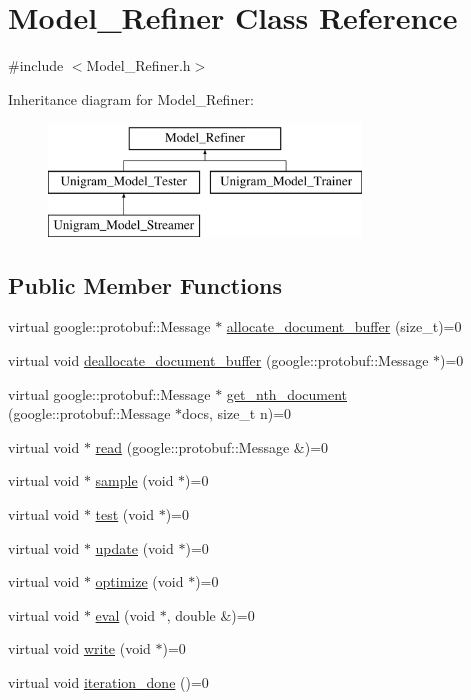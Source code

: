 \hypertarget{class_model___refiner}{
\section{Model\_\-Refiner Class Reference}
\label{class_model___refiner}
}


{\ttfamily \#include $<$Model\_\-Refiner.h$>$}

Inheritance diagram for Model\_\-Refiner:\begin{figure}[H]
\begin{center}
\leavevmode
\includegraphics[height=3cm]{class_model___refiner}
\end{center}
\end{figure}
\subsection*{Public Member Functions}
\begin{DoxyCompactItemize}
\item 
virtual google::protobuf::Message $\ast$ \hyperlink{class_model___refiner_a516dd37d4b76cceeb18e6bdf269b8b04}{allocate\_\-document\_\-buffer} (size\_\-t)=0
\item 
virtual void \hyperlink{class_model___refiner_a3787b875dfd41de8db8b1e46cfe40d16}{deallocate\_\-document\_\-buffer} (google::protobuf::Message $\ast$)=0
\item 
virtual google::protobuf::Message $\ast$ \hyperlink{class_model___refiner_a6d3bb23a5d76951144004d61b2fdcbe7}{get\_\-nth\_\-document} (google::protobuf::Message $\ast$docs, size\_\-t n)=0
\item 
virtual void $\ast$ \hyperlink{class_model___refiner_ae6b2ecaaddf8aa0876cfb42bff713607}{read} (google::protobuf::Message \&)=0
\item 
virtual void $\ast$ \hyperlink{class_model___refiner_a6c2ecd4d1df247352c8319e0eb17e1e2}{sample} (void $\ast$)=0
\item 
virtual void $\ast$ \hyperlink{class_model___refiner_a5aeef4eee7a0d4f1878356d891ded76d}{test} (void $\ast$)=0
\item 
virtual void $\ast$ \hyperlink{class_model___refiner_a5766465773d95e73a36dac702cfe2298}{update} (void $\ast$)=0
\item 
virtual void $\ast$ \hyperlink{class_model___refiner_a238a8d648f8b1c0966ea8e4cbbaa9e9e}{optimize} (void $\ast$)=0
\item 
virtual void $\ast$ \hyperlink{class_model___refiner_afc5cd8181d1f6fc3ebf0a6bad1d8f023}{eval} (void $\ast$, double \&)=0
\item 
virtual void \hyperlink{class_model___refiner_a7a98ac7633d5d15d959d9b9c1a414576}{write} (void $\ast$)=0
\item 
virtual void \hyperlink{class_model___refiner_a570c3bd6742f609ba86d724e8f070f1a}{iteration\_\-done} ()=0
\end{DoxyCompactItemize}


